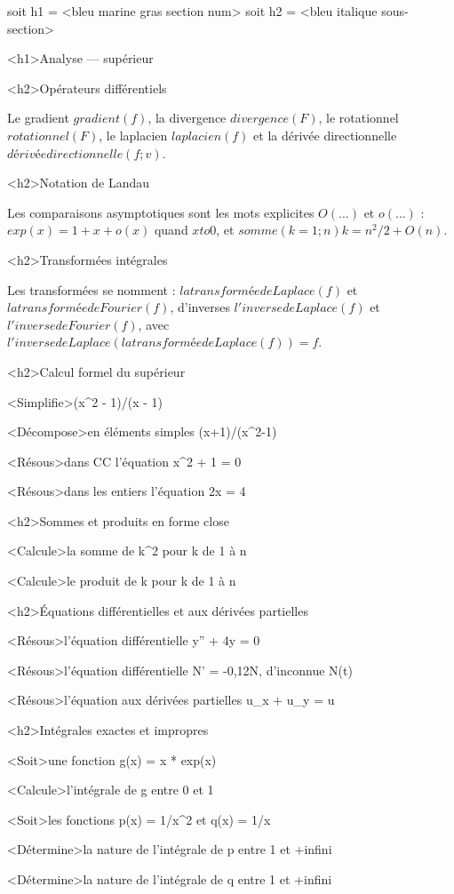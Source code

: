 \documentclass[marges=20, taille=11, precision=3]{texecole}
\begin{document}
soit h1 = <bleu marine gras section num>
soit h2 = <bleu italique sous-section>

<h1>Analyse — supérieur


<h2>Opérateurs différentiels

Le gradient $gradient(f)$, la divergence $divergence(F)$, le rotationnel $rotationnel(F)$, le laplacien $laplacien(f)$ et la dérivée directionnelle $dérivée directionnelle(f; v)$.

<h2>Notation de Landau

Les comparaisons asymptotiques sont les mots explicites $O(...)$ et
$o(...)$ :
$exp(x) = 1 + x + o(x)$ quand $x to 0$, et
$somme(k=1;n) k = n^2/2 + O(n)$.

<h2>Transformées intégrales

Les transformées se nomment : $la transformée de Laplace(f)$ et
$la transformée de Fourier(f)$, d'inverses $l'inverse de Laplace(f)$ et $l'inverse de Fourier(f)$, avec
$l'inverse de Laplace(la transformée de Laplace(f)) = f$.

<h2>Calcul formel du supérieur

<Simplifie>(x^2 - 1)/(x - 1)

<Décompose>en éléments simples (x+1)/(x^2-1)

<Résous>dans CC l'équation x^2 + 1 = 0

<Résous>dans les entiers l'équation 2x = 4

<h2>Sommes et produits en forme close

<Calcule>la somme de k^2 pour k de 1 à n

<Calcule>le produit de k pour k de 1 à n

<h2>Équations différentielles et aux dérivées partielles

<Résous>l'équation différentielle y'' + 4y = 0

<Résous>l'équation différentielle N' = -0,12N, d'inconnue N(t)

<Résous>l'équation aux dérivées partielles u_x + u_y = u

<h2>Intégrales exactes et impropres

<Soit>une fonction g(x) = x * exp(x)

<Calcule>l'intégrale de g entre 0 et 1

<Soit>les fonctions p(x) = 1/x^2 et q(x) = 1/x

<Détermine>la nature de l'intégrale de p entre 1 et +infini

<Détermine>la nature de l'intégrale de q entre 1 et +infini
\end{document}
